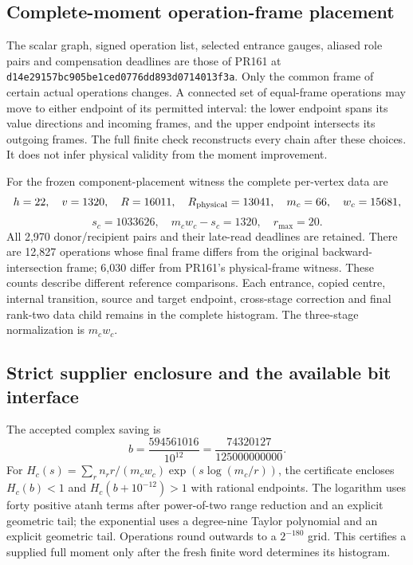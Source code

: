 \subsection{Complete-moment operation-frame placement}
The scalar graph, signed operation list, selected entrance gauges, aliased
role pairs and compensation deadlines are those of PR161 at
\texttt{d14e29157bc905be1ced0776dd893d0714013f3a}. Only the common frame
of certain actual operations changes. A connected set of equal-frame
operations may move to either endpoint of its permitted interval:
the lower endpoint spans its value directions and incoming frames, and
the upper endpoint intersects its outgoing frames. The full finite check
reconstructs every chain after these choices. It does not infer physical
validity from the moment improvement.

For the frozen component-placement witness the complete per-vertex data are
\[
 h=22,\quad v=1320,\quad R=16011,\quad R_{\rm physical}=13041,
 \quad m_c=66,\quad w_c=15681,
\]
\[
 s_c=1033626,\quad m_cw_c-s_c=1320,\quad r_{\max}=20.
\]
All 2,970 donor/recipient pairs and their late-read deadlines are retained.
There are 12,827 operations whose final frame differs from the original
backward-intersection frame; 6,030 differ from PR161's physical-frame
witness. These counts describe different reference comparisons.
Each entrance, copied centre, internal transition, source and target
endpoint, cross-stage correction and final rank-two data child remains
in the complete histogram. The three-stage normalization is $m_cw_c$.

\subsection{Strict supplier enclosure and the available bit interface}
The accepted complex saving is
\[
 b=\frac{594561016}{10^{12}}
   =\frac{74320127}{125000000000}.
\]
For $H_c(s)=\sum_r n_r r/(m_cw_c)\exp(s\log(m_c/r))$, the certificate
encloses $H_c(b)<1$ and $H_c(b+10^{-12})>1$ with rational endpoints.
The logarithm uses forty positive atanh terms after power-of-two range
reduction and an explicit geometric tail; the exponential uses a
degree-nine Taylor polynomial and an explicit geometric tail. Operations
round outwards to a $2^{-180}$ grid. This certifies a supplied full moment
only after the fresh finite word determines its histogram.

